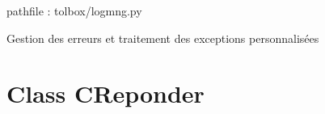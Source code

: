 \documentclass[letterpaper,10pt,french]{sphinxmanual}
\begin{document}
pathfile : tolbox/logmng.py

\label{\detokenize{classes/cfgloader:module-toolbox.logmng}}

\begin{fulllineitems}
\label{\detokenize{classes/cfgloader:toolbox.logmng.CError}}
Gestion des erreurs et traitement des exceptions personnalisées

\end{fulllineitems}



\section{Class CReponder}
\label{\detokenize{classes/cfgloader:class-creponder}}
\end{document}
